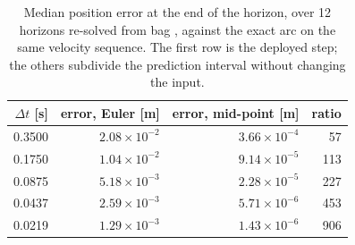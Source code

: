 \begin{table}[htbp]
  \centering
  \small
  \caption{Median position error at the end of the horizon, over 12 horizons re-solved from bag \texttt{\resIntegBagName}, against the exact arc on the same velocity sequence. The first row is the deployed step; the others subdivide the prediction interval without changing the input.}
  \label{res:tab:integbag}
  \begin{tabular}{rrrr}
    \toprule
    $\Delta t$ [s] & error, Euler [m] & error, mid-point [m] & ratio \\
    \midrule
    0.3500 & $2.08\times 10^{-2}$ & $3.66\times 10^{-4}$ & 57 \\
    0.1750 & $1.04\times 10^{-2}$ & $9.14\times 10^{-5}$ & 113 \\
    0.0875 & $5.18\times 10^{-3}$ & $2.28\times 10^{-5}$ & 227 \\
    0.0437 & $2.59\times 10^{-3}$ & $5.71\times 10^{-6}$ & 453 \\
    0.0219 & $1.29\times 10^{-3}$ & $1.43\times 10^{-6}$ & 906 \\
    \bottomrule
  \end{tabular}
\end{table}

